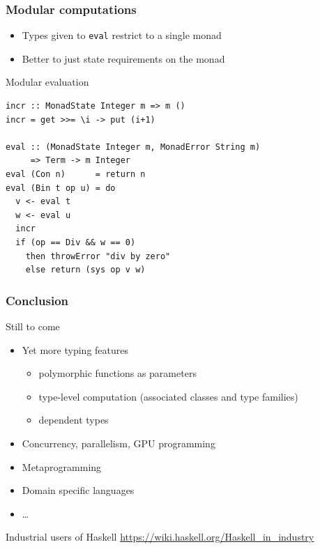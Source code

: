 \documentclass{beamer}
\begin{document}
\begin{frame}[fragile]
  \frametitle{Modular computations}
  \begin{itemize}
  \item Types given to \lstinline{eval} restrict to a single monad
  \item Better to just state requirements on the monad
  \end{itemize}
  \begin{exampleblock}{Modular evaluation}
\begin{lstlisting}
incr :: MonadState Integer m => m ()
incr = get >>= \i -> put (i+1)

eval :: (MonadState Integer m, MonadError String m)
     => Term -> m Integer
eval (Con n)      = return n
eval (Bin t op u) = do
  v <- eval t
  w <- eval u
  incr
  if (op == Div && w == 0) 
    then throwError "div by zero"
    else return (sys op v w)
\end{lstlisting}
  \end{exampleblock}
\end{frame}
\begin{frame}
  \frametitle{Conclusion}

  \begin{block}{Still to come}
    \begin{itemize}
    \item Yet more typing features
      \begin{itemize}
      \item polymorphic functions as parameters
      \item type-level computation (associated classes and type
        families)
      \item dependent types 
      \end{itemize}
    \item Concurrency, parallelism, GPU programming
    \item Metaprogramming
    \item Domain specific languages
    \item \dots
    \end{itemize}
  \end{block}
  \begin{alertblock}{Industrial users of Haskell}
    \url{https://wiki.haskell.org/Haskell_in_industry}
  \end{alertblock}
\end{frame}
\end{document}
